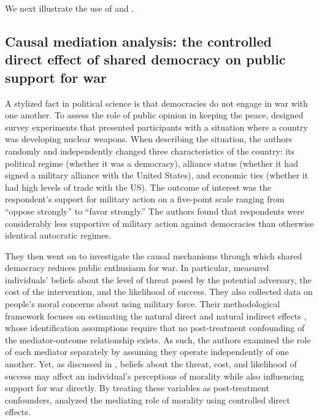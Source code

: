 We next illustrate the use of  and .

\hypertarget{causal-mediation-example}{%
\subsection{Causal mediation analysis: the controlled direct effect of
shared democracy on public support for
war}\label{causal-mediation-example}}

A stylized fact in political science is that democracies do not engage
in war with one another. To assess the role of public opinion in keeping
the peace, \citet{tomzPublicOpinionDemocratic2013a} designed survey
experiments that presented participants with a situation where a country
was developing nuclear weapons. When describing the situation, the
authors randomly and independently changed three characteristics of the
country: its political regime (whether it was a democracy), alliance
status (whether it had signed a military alliance with the United
States), and economic ties (whether it had high levels of trade with the
US). The outcome of interest was the respondent's support for military
action on a five-point scale ranging from ``oppose strongly'' to ``favor
strongly.'' The authors found that respondents were considerably less
supportive of military action against democracies than otherwise
identical autocratic regimes.

They then went on to investigate the causal mechanisms through which
shared democracy reduces public enthusiasm for war. In particular,
\citet{tomzPublicOpinionDemocratic2013a} measured individuals' beliefs
about the level of threat posed by the potential adversary, the cost of
the intervention, and the likelihood of success. They also collected
data on people's moral concerns about using military force. Their
methodological framework focuses on estimating the natural direct and
natural indirect effects
\citep{imaiUnpackingBlackBox2011, imaiIdentificationInferenceSensitivity2010},
whose identification assumptions require that no post-treatment
confounding of the mediator-outcome relationship exists. As such, the
authors examined the role of each mediator separately by assuming they
operate independently of one another. Yet, as discussed in
\citet{zhouResidualBalancingMethod2020a}, beliefs about the threat,
cost, and likelihood of success may affect an individual's perceptions
of morality while also influencing support for war directly. By treating
these variables as post-treatment confounders,
\citet{zhouResidualBalancingMethod2020a} analyzed the mediating role of
morality using controlled direct effects.


